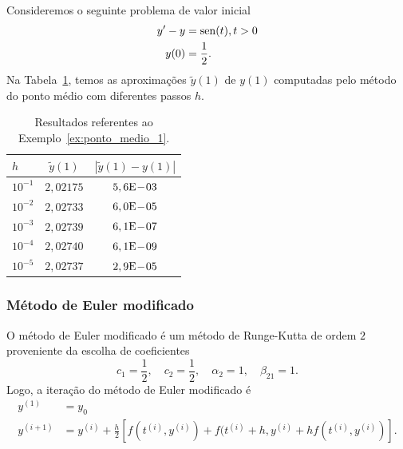 \begin{ex}\label{ex:ponto_medio_1}
  Consideremos o seguinte problema de valor inicial
  \begin{align}
    y' - y &= \operatorname{sen}(t), t>0\\
    y(0) &= \frac{1}{2}.
  \end{align}
  Na Tabela~\ref{tab:ex_ponto_medio_1}, temos as aproximações $\tilde{y}(1)$ de $y(1)$ computadas pelo método do ponto médio com diferentes passos $h$.
 
  \begin{table}[h!]
    \centering
    \begin{tabular}{l|cc}
      $h$ & $\tilde{y}(1)$ & $|\tilde{y}(1)-y(1)|$\\\hline
      $10^{-1}$ & $2,02175$ & $5,6\mathrm{E}\!-\!03$ \\
      $10^{-2}$ & $2,02733$ & $6,0\mathrm{E}\!-\!05$ \\
      $10^{-3}$ & $2,02739$ & $6,1\mathrm{E}\!-\!07$ \\
      $10^{-4}$ & $2,02740$ & $6,1\mathrm{E}\!-\!09$ \\
      $10^{-5}$ & $2,02737$ & $2,9\mathrm{E}\!-\!05$ \\\hline
    \end{tabular}
    \caption{Resultados referentes ao Exemplo~\ref{ex:ponto_medio_1}.}
    \label{tab:ex_ponto_medio_1}
  \end{table}





\end{ex}

\subsubsection{Método de Euler modificado}

O método de Euler modificado é um método de Runge-Kutta de ordem $2$ proveniente da escolha de coeficientes
\begin{equation}
  c_1 = \frac{1}{2}, \quad c_2 = \frac{1}{2}, \quad \alpha_2 = 1,\quad \beta_{21}=1.
\end{equation}
Logo, a iteração do método de Euler modificado é
\begin{align}
  y^{(1)} &= y_0\\
  y^{(i+1)} &= y^{(i)} + \frac{h}{2}\left[f(t^{(i)},y^{(i)}) + f(t^{(i)}+h,y^{(i)}+hf(t^{(i)},y^{(i)})\right].
\end{align}

